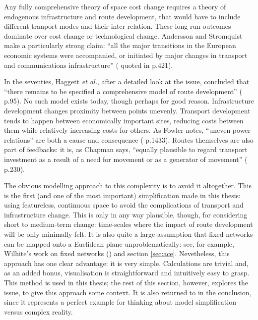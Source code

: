 {Any fully comprehensive theory of space cost change requires a theory of endogenous infrastructure and route development, that would have to include different tranport modes and their inter-relation. These long run outcomes dominate over cost change or technological change. Andersson and Stromquist make a particularly strong claim: ``all the major transitions in the European economic systems were accompanied, or initiated by major changes in transport and communications infrastructure'' (\citealt{batten_transportation_1988} quoted in \citealt{button_transport_2010} p.421). 

In the seventies, Haggett \emph{et al.}, after a detailed look at the issue, concluded that ``there remains to be specified a comprehensive model of route development'' (\citealt{haggett_locational_1977} p.95). No such model exists today, though perhaps for good reason. Infrastructure development changes proximity between points unevenly. Transport development tends to happen between economically important sites, reducing costs between them while relatively increasing costs for others. As Fowler notes, ``uneven power relations'' are both a cause and consequence (\citealt{fowler_reexploring_2006} p.1433). Routes themselves are also part of feedbacks: it is, as Chapman says, ``equally plausible to regard transport investment as a result of a need for movement or as a generator of movement'' (\citealt{chapman_people_1979} p.230). 

The obvious modelling approach to this complexity is to avoid it altogether. This is the first (and one of the most important) simplification made in this thesis: using featureless, continuous space to avoid the complications of transport and infrastructure change. This is only in any way plausible, though, for considering short to medium-term change: time-scales where the impact of route development will be only minimally felt. It is also quite a large assumption that fixed networks can be mapped onto a Euclidean plane unproblematically: see, for example, Wilhite's work on fixed networks (\citealt{wilhite_economic_2006}) and section \ref{sec:ace}. Nevetheless, this approach has one clear advantage: it is very simple. Calculations are trivial and, as an added bonus, visualisation is straightforward and intuitively easy to grasp. This method is used in this thesis; the rest of this section, however, explores the issue, to give this approach some context. It is also returned to in the conclusion, since it represents a perfect example for thinking about model simplification versus complex reality.

}
